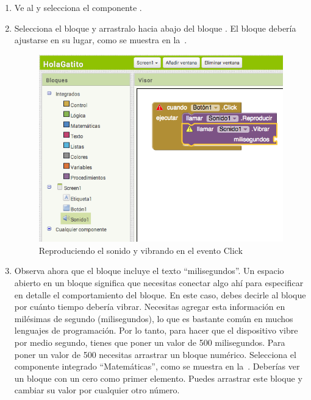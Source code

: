 \documentclass[letterpaper]{article}
\begin{document}
\begin{enumerate}

\item Ve al \blockEditor y selecciona el componente
  .

\item Selecciona el bloque  y arrastralo
  hacia abajo del bloque . El bloque
  debería ajustarse en su lugar, como se muestra en
  la~.

\begin{figure}[H]
\centering
\includegraphics[scale=0.25]{figures/button1ClickPlayVibrate}
\caption{Reproduciendo el sonido y vibrando en el evento Click}
\label{fig:button1ClickPlayVibrate}
\end{figure}


\item Observa ahora que el bloque 
  incluye el texto ``milisegundos''. Un espacio abierto en un bloque
  significa que necesitas conectar algo ahí para especificar en
  detalle el comportamiento del bloque. En este caso, debes decirle al
  bloque por cuánto tiempo debería vibrar. Necesitas agregar esta
  información en milésimas de segundo (milisegundos), lo que es
  bastante común en muchos lenguajes de programación. Por lo tanto,
  para hacer que el dispositivo vibre por medio segundo, tienes que
  poner un valor de 500 milisegundos. Para poner un valor de 500
  necesitas arrastrar un bloque numérico. Selecciona el componente
  integrado ``Matemáticas'', como se muestra en
  la~. Deberías ver un bloque
  con un cero como primer elemento. Puedes arrastrar este bloque y
  cambiar su valor por cualquier otro número.


\end{enumerate}
\end{document}

